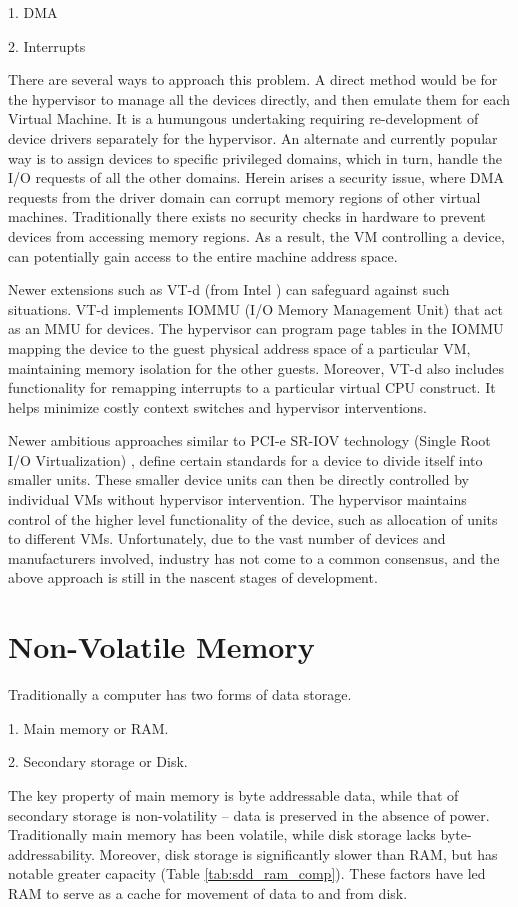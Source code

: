 1. DMA

2. Interrupts

There are several ways to approach this problem. A direct method would be for the hypervisor to manage all the devices directly, and then emulate them for each Virtual Machine. It is a humungous undertaking requiring re-development of device drivers separately for the hypervisor. An alternate and currently popular way is to assign devices to specific privileged domains, which in turn, handle the I/O requests of all the other domains. Herein arises a security issue, where DMA requests from the driver domain can corrupt memory regions of other virtual machines. Traditionally there exists no security checks in hardware to prevent devices from accessing memory regions. As a result, the VM controlling a device, can potentially gain access to the entire machine address space.

Newer extensions such as VT-d (from Intel \cite{intelvtd}) can safeguard against such situations. VT-d implements IOMMU (I/O Memory Management Unit) that act as an MMU for devices. The hypervisor can program page tables in the IOMMU mapping the device to the guest physical address space of a particular VM, maintaining memory isolation for the other guests. Moreover, VT-d also includes functionality for remapping interrupts to a particular virtual CPU construct. It helps minimize costly context switches and hypervisor interventions.

Newer ambitious approaches similar to PCI-e SR-IOV technology (Single Root I/O Virtualization) \cite{sriov}, define certain standards for a device to divide itself into smaller units. These smaller device units can then be directly controlled by individual VMs without hypervisor intervention. The hypervisor maintains control of the higher level functionality of the device, such as allocation of units to different VMs. Unfortunately, due to the vast number of devices and manufacturers involved, industry has not come to a common consensus, and the above approach is still in the nascent stages of development. 

\section{Non-Volatile Memory}
Traditionally a computer has two forms of data storage.

1. Main memory or RAM.

2. Secondary storage or Disk.

The key property of main memory is byte addressable data, while that of secondary storage is non-volatility -- data is preserved in the absence of power. Traditionally main memory has been volatile, while disk storage lacks byte-addressability. Moreover, disk storage is significantly slower than RAM, but has notable greater capacity (Table \ref{tab:sdd_ram_comp}). These factors have led RAM to serve as a cache for movement of data to and from disk.

